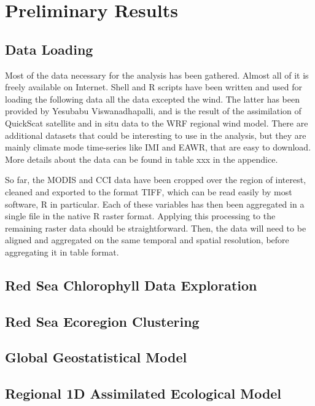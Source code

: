 \chapter{Preliminary Results}

\section{Data Loading}

Most of the data necessary for the analysis has been gathered. Almost all of it is freely available on Internet. Shell and R scripts have been written and used for loading the following data all the data excepted the wind. The latter has been provided by Yesubabu Viswanadhapalli, and is the result of the assimilation of QuickScat satellite and in situ data to the WRF regional wind model. There are additional datasets that could be interesting to use in the analysis, but they are mainly climate mode time-series like IMI and EAWR, that are easy to download. More details about the data can be found in table xxx in the appendice.

So far, the MODIS and CCI data have been cropped over the region of interest, cleaned and exported to the format TIFF, which can be read easily by most software, R in particular. Each of these variables has then been aggregated in a single file in the native R raster format. Applying this processing to the remaining raster data should be straightforward. Then, the data will need to be aligned and aggregated on the same temporal and spatial resolution, before aggregating it in table format.

\section{Red Sea Chlorophyll Data Exploration}

\section{Red Sea Ecoregion Clustering}

\section{Global Geostatistical Model}

\section{Regional 1D Assimilated Ecological Model}

